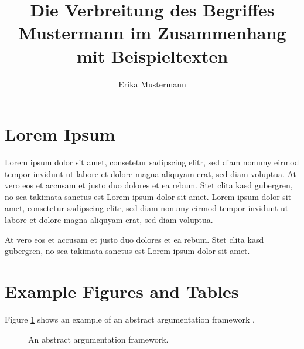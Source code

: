\documentclass[f,master,twoside,binding,palatino]{AIGthesis}
\author{Erika Mustermann}
\title{Die Verbreitung des Begriffes \glqq{}Mustermann\grqq{} im Zusammenhang mit Beispieltexten}
\begin{document}
\maketitle%


\tableofcontents%
\cleardoublepage%





\section{Lorem Ipsum}
Lorem ipsum dolor sit amet, consetetur sadipscing elitr, sed diam nonumy eirmod tempor invidunt ut labore et dolore magna aliquyam erat, sed diam voluptua. At vero eos et accusam et justo duo dolores et ea rebum. Stet clita kasd gubergren, no sea takimata sanctus est Lorem ipsum dolor sit amet. Lorem ipsum dolor sit amet, consetetur sadipscing elitr, sed diam nonumy eirmod tempor invidunt ut labore et dolore magna aliquyam erat, sed diam voluptua.

At vero eos et accusam et justo duo dolores et ea rebum. Stet clita kasd gubergren, no sea takimata sanctus est Lorem ipsum dolor sit amet.


\section{Example Figures and Tables}

Figure \ref{fig:af} shows an example of an abstract argumentation framework \cite{dung1995acceptability}.

\begin{figure}[ht]
    \centering
    \caption{An abstract argumentation framework.}
    \label{fig:af}
\end{figure}
\end{document}
